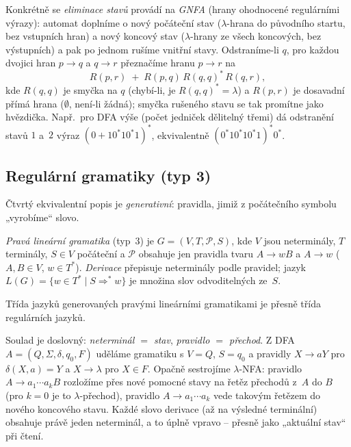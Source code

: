\documentclass[11pt,a4paper]{article}
\begin{document}
\begin{poznamka}
Konkrétně se \emph{eliminace stavů} provádí na \emph{GNFA} (hrany ohodnocené regulárními výrazy): automat doplníme o nový počáteční stav ($\lambda$-hrana do původního startu, bez vstupních hran) a nový koncový stav ($\lambda$-hrany ze všech koncových, bez výstupních) a pak po jednom rušíme vnitřní stavy. Odstraníme-li $q$, pro každou dvojici hran $p\to q$ a $q\to r$ přeznačíme hranu $p\to r$ na
\[ R(p,r)\;+\;R(p,q)\,R(q,q)^*\,R(q,r), \]
kde $R(q,q)$ je smyčka na $q$ (chybí-li, je $R(q,q)^*=\lambda$) a $R(p,r)$ je dosavadní přímá hrana ($\emptyset$, není-li žádná); smyčka rušeného stavu se tak promítne jako hvězdička. Např.\ pro DFA výše (počet jedniček dělitelný třemi) dá odstranění stavů $1$ a~$2$ výraz $(0+10^*10^*1)^*$, ekvivalentně $(0^*10^*10^*1)^*0^*$.
\end{poznamka}

\subsection{Regulární gramatiky (typ 3)}

Čtvrtý ekvivalentní popis je \emph{generativní}: pravidla, jimiž z počátečního symbolu „vyrobíme`` slovo.

\begin{definice}
\emph{Pravá lineární gramatika} (typ~3) je $G=(V,T,\mathcal P,S)$, kde $V$ jsou neterminály, $T$ terminály, $S\in V$ počáteční a $\mathcal P$ obsahuje jen pravidla tvaru $A\to wB$ a $A\to w$ ($A,B\in V$, $w\in T^*$). \emph{Derivace} přepisuje neterminály podle pravidel; jazyk $L(G)=\{w\in T^*\mid S\Rightarrow^* w\}$ je množina slov odvoditelných ze~$S$.
\end{definice}

\begin{veta}[Regulární gramatiky $=$ konečné automaty]
Třída jazyků generovaných pravými lineárními gramatikami je přesně třída regulárních jazyků.
\end{veta}

\begin{intuice}
Soulad je doslovný: \emph{neterminál $=$ stav}, \emph{pravidlo $=$ přechod}. Z DFA $A=(Q,\Sigma,\delta,q_0,F)$ uděláme gramatiku s $V=Q$, $S=q_0$ a pravidly $X\to aY$ pro $\delta(X,a)=Y$ a $X\to\lambda$ pro $X\in F$. Opačně sestrojíme $\lambda$-NFA: pravidlo $A\to a_1\cdots a_kB$ rozložíme přes nové pomocné stavy na řetěz přechodů z~$A$ do $B$ (pro $k=0$ je to $\lambda$-přechod), pravidlo $A\to a_1\cdots a_k$ vede takovým řetězem do nového koncového stavu. Každé slovo derivace (až na výsledné terminální) obsahuje právě jeden neterminál, a to úplně vpravo -- přesně jako „aktuální stav`` při čtení.
\end{intuice}
\end{document}
